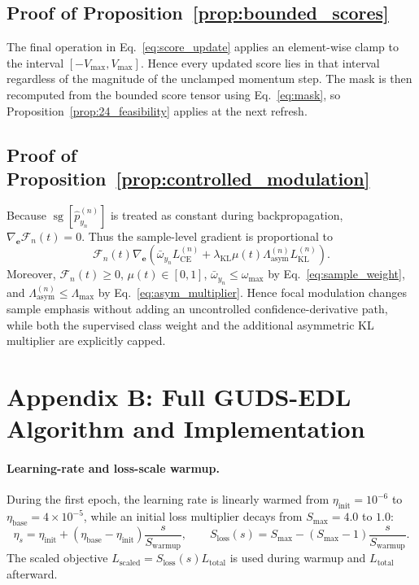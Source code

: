 \documentclass[letterpaper]{article} %
\begin{document}
\subsection{Proof of Proposition~\ref{prop:bounded_scores}}
The final operation in Eq.~\ref{eq:score_update} applies an element-wise clamp to the interval $[-V_{\max},V_{\max}]$. Hence every updated score lies in that interval regardless of the magnitude of the unclamped momentum step. The mask is then recomputed from the bounded score tensor using Eq.~\ref{eq:mask}, so Proposition~\ref{prop:24_feasibility} applies at the next refresh.

\subsection{Proof of Proposition~\ref{prop:controlled_modulation}}
Because $\operatorname{sg}[\hat{p}_{y_n}^{(n)}]$ is treated as constant during backpropagation, $\nabla_{\bm{e}}\mathcal{F}_n(t)=0$. Thus the sample-level gradient is proportional to
\begin{equation}
    \mathcal{F}_n(t)
    \nabla_{\bm{e}}\!\left(
    \bar{\omega}_{y_n}L_{\text{CE}}^{(n)}
    +\lambda_{\text{KL}}\mu(t)\Lambda_{\text{asym}}^{(n)}
    L_{\text{KL}}^{(n)}
    \right).
\end{equation}
Moreover, $\mathcal{F}_n(t)\ge0$, $\mu(t)\in[0,1]$, $\bar{\omega}_{y_n}\le\omega_{\max}$ by Eq.~\ref{eq:sample_weight}, and $\Lambda_{\text{asym}}^{(n)}\le\Lambda_{\max}$ by Eq.~\ref{eq:asym_multiplier}. Hence focal modulation changes sample emphasis without adding an uncontrolled confidence-derivative path, while both the supervised class weight and the additional asymmetric KL multiplier are explicitly capped.

\FloatBarrier
\section{Appendix B: Full GUDS-EDL Algorithm and Implementation}
\paragraph{Learning-rate and loss-scale warmup.}
During the first epoch, the learning rate is linearly warmed from $\eta_{\text{init}}=10^{-6}$ to $\eta_{\text{base}}=4\times10^{-5}$, while an initial loss multiplier decays from $S_{\max}=4.0$ to $1.0$:
\begin{equation}\label{eq:warmup_main}
    \eta_s=\eta_{\text{init}}+(\eta_{\text{base}}-\eta_{\text{init}})
    \frac{s}{S_{\text{warmup}}},
    \qquad
    S_{\text{loss}}(s)=S_{\max}-(S_{\max}-1)
    \frac{s}{S_{\text{warmup}}}.
\end{equation}
The scaled objective $L_{\text{scaled}}=S_{\text{loss}}(s)L_{\text{total}}$ is used during warmup and $L_{\text{total}}$ afterward.
\end{document}
